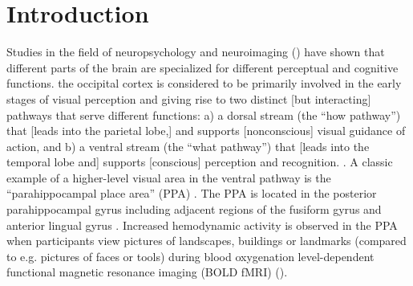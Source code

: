 \documentclass[english,11pt]{article}
\begin{document}

\pagebreak[4]



\section*{Introduction}



Studies in the field of neuropsychology and neuroimaging
(\citep[e.g.,][]{penfield1950cerebral, fox1984noninvasive}) have shown that
different parts of the brain are specialized for different perceptual and
cognitive functions.
the occipital cortex is considered to be primarily involved in the early stages
of visual perception and giving rise to two distinct [but interacting] pathways
that serve different functions:
a) a dorsal stream (the ``how pathway'') that [leads into the parietal lobe,]
and supports [nonconscious] visual guidance of action, and
b) a ventral stream (the ``what pathway'') that [leads into the temporal lobe
and] supports [conscious] perception and recognition.
\citep{goodale1992separate, milner2017two, ungerleider1982two}.
A classic example of a higher-level visual area in the ventral pathway is the
``parahippocampal place area'' (PPA) \citep{epstein1998ppa,
epstein1999parahippocampal}.
The PPA is located in the posterior parahippocampal gyrus including adjacent
regions of the fusiform gyrus and anterior lingual gyrus
\citep{epstein2008parahippocampal}.
Increased hemodynamic activity is observed in the PPA when participants view
pictures of landscapes, buildings or landmarks (compared to e.g. pictures of
faces or tools) during blood oxygenation level-dependent functional magnetic
resonance imaging (BOLD fMRI) (\citep[see reviews][]{epstein2014neural,
aminoff2013role}).
\end{document}
